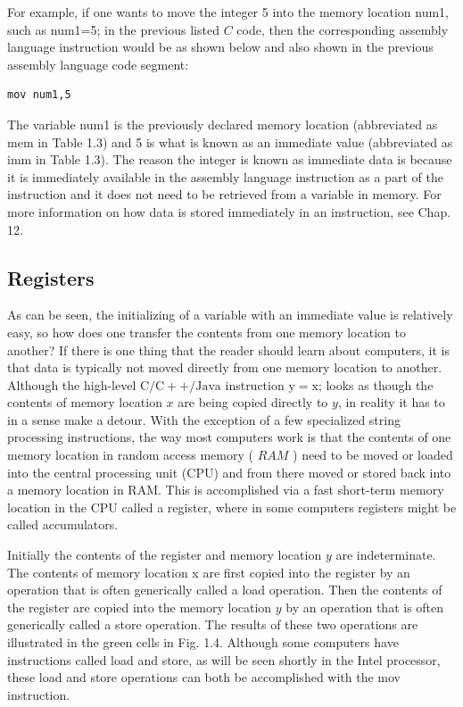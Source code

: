 \documentclass[10pt]{book}
\begin{document}
For example, if one wants to move the integer 5 into the memory location num1, such as num1=5; in the previous listed $C$ code, then the corresponding assembly language instruction would be as shown below and also shown in the previous assembly language code segment:

\begin{verbatim}
mov num1,5
\end{verbatim}

The variable num1 is the previously declared memory location (abbreviated as mem in Table 1.3) and 5 is what is known as an immediate value (abbreviated as imm in Table 1.3). The reason the integer is known as immediate data is because it is immediately available in the assembly language instruction as a part of the instruction and it does not need to be retrieved from a variable in memory. For more information on how data is stored immediately in an instruction, see Chap. 12.

\subsection{Registers}
As can be seen, the initializing of a variable with an immediate value is relatively easy, so how does one transfer the contents from one memory location to another? If there is one thing that the reader should learn about computers, it is that data is typically not moved directly from one memory location to another. Although the high-level $\mathrm{C} / \mathrm{C}++/ \mathrm{Java}$ instruction $\mathrm{y}=\mathrm{x}$; looks as though the contents of memory location $x$ are being copied directly to $y$, in reality it has to in a sense make a detour. With the exception of a few specialized string processing instructions, the way most computers work is that the contents of one memory location in random access memory ( $R A M$ ) need to be moved or loaded into the central processing unit (CPU) and from there moved or stored back into a memory location in RAM. This is accomplished via a fast short-term memory location in the CPU called a register, where in some computers registers might be called accumulators.

Initially the contents of the register and memory location $y$ are indeterminate. The contents of memory location x are first copied into the register by an operation that is often generically called a load operation. Then the contents of the register are copied into the memory location $y$ by an operation that is often generically called a store operation. The results of these two operations are illustrated in the green cells in Fig. 1.4. Although some computers have instructions called load and store, as will be seen shortly in the Intel processor, these load and store operations can both be accomplished with the mov instruction.
\end{document}
